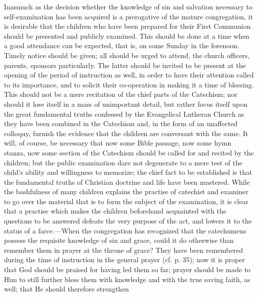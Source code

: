 Inasmuch as the decision whether the knowledge of sin and salvation necessary to self-examination has been acquired is a prerogative of the mature congregation, it is desirable that the children who have been prepared for their First Communion should be presented and publicly examined. This
should be done at a time when a good attendance can be expected, that is, on some Sunday in the forenoon. Timely notice should be given; all should be urged to attend, the church officers, parents, sponsors particularly. The latter should be invited to be present at the opening of the period of instruction as well, in order to have their attention called to its importance, and to solicit their co-operation in making it a time of blessing. This should not be a mere recitation of the chief parts of the Catechism; nor should it lose itself in a mass of unimportant detail, but rather focus itself upon the great fundamental truths confessed by the Evangelical Lutheran Church as they have been combined in the Catechism and, in the form of an unaffected colloquy, furnish the evidence that the children are conversant with the same. It will, of course, be necessary that now some Bible passage, now some hymn stanza, now some section of the Catechism should be called for and recited by the children; but the public examination dare not degenerate to a mere test of the child’s ability and willingness to memorize; the chief fact to be established is that the fundamental truths of Christian doctrine and life have been mastered. While the bashfulness of many children explains the practise of catechist and examiner to go over the material that is to form the subject of the examination, it is clear that a practise which makes the children beforehand acquainted with the questions to be answered defeats the very purpose of the act, and lowers it to the status of a farce.—When the congregation has recognized that the catechumens possess the requisite knowledge of sin and grace, could it do otherwise than remember them in prayer at the throne of grace? They have been remembered during the time of instruction in the general prayer (cf. p. 35); now it is proper that God should be praised for having led them so far; prayer should be made to Him to still further bless them with knowledge and with the true saving faith, as well; that He should therefore strengthen
